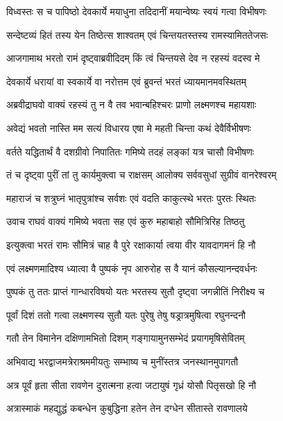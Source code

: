 \twolineshloka
{विध्वस्तः स च पापिष्ठो देवकार्ये मयाधुना}
{तदिदानीं मयान्वेष्यः स्वयं गत्वा विभीषणः}%

\twolineshloka
{सन्देष्टव्यं हितं तस्य येन तिष्ठेत्स शाश्वतम्}
{एवं चिन्तयतस्तस्य रामस्यामिततेजसः}%

\twolineshloka
{आजगामाथ भरतो रामं दृष्ट्वाब्रवीदिदम्}
{किं त्वं चिन्तयसे देव न रहस्यं वदस्व मे}%

\twolineshloka
{देवकार्ये धरायां वा स्वकार्ये वा नरोत्तम}
{एवं ब्रुवन्तं भरतं ध्यायमानमवस्थितम्}%

\twolineshloka
{अब्रवीद्राघवो वाक्यं रहस्यं तु न वै तव}
{भवान्बहिश्चरः प्राणो लक्ष्मणश्च महायशाः}%

\twolineshloka
{अवेद्यं भवतो नास्ति मम सत्यं विधारय}
{एषा मे महती चिन्ता कथं देवैर्विभीषणः}%

\twolineshloka
{वर्तते यद्धितार्थं वै दशग्रीवो निपातितः}
{गमिष्ये तदहं लङ्कां यत्र चासौ विभीषणः}%

\twolineshloka
{तं च दृष्ट्वा पुरीं तां तु कार्यमुक्त्वा च राक्षसम्}
{आलोक्य सर्ववसुधां सुग्रीवं वानरेश्वरम्}%

\twolineshloka
{महाराजं च शत्रुघ्नं भातृपुत्रांश्च सर्वशः}
{एवं वदति काकुत्स्थे भरतः पुरतः स्थितः}%

\twolineshloka
{उवाच राघवं वाक्यं गमिष्ये भवता सह}
{एवं कुरु महाबाहो सौमित्रिरिह तिष्ठतु}%

\twolineshloka
{इत्युक्त्वा भरतं रामः सौमित्रं चाह वै पुरे}
{रक्षाकार्या त्वया वीर यावदागमनं हि नौ}%

\twolineshloka
{एवं लक्ष्मणमादिश्य ध्यात्वा वै पुष्पकं नृप}
{आरुरोह स वै यानं कौसल्यानन्दवर्धनः}%

\twolineshloka
{पुष्पकं तु ततः प्राप्तं गान्धारविषयो यतः}
{भरतस्य सुतौ दृष्ट्वा जगन्नीतिं निरीक्ष्य च}%

\twolineshloka
{पूर्वां दिशं ततो गत्वा लक्ष्मणस्य सुतौ यतः}
{पुरेषु तेषु षड्रात्रमुषित्वा रघुनन्दनौ}%

\twolineshloka
{गतौ तेन विमानेन दक्षिणामभितो दिशम्}
{गङ्गायामुनसम्भेदं प्रयागमृषिसेवितम्}%

\twolineshloka
{अभिवाद्य भरद्वाजमत्रेराश्रममीयतुः}
{सम्भाष्य च मुनींस्तत्र जनस्थानमुपागतौ}%


\twolineshloka
{अत्र पूर्वं हृता सीता रावणेन दुरात्मना}
{हत्वा जटायुषं गृध्रं योसौ पितृसखो हि नौ}%

\twolineshloka
{अत्रास्माकं महद्युद्धं कबन्धेन कुबुद्धिना}
{हतेन तेन दग्धेन सीतास्ते रावणालये}%

